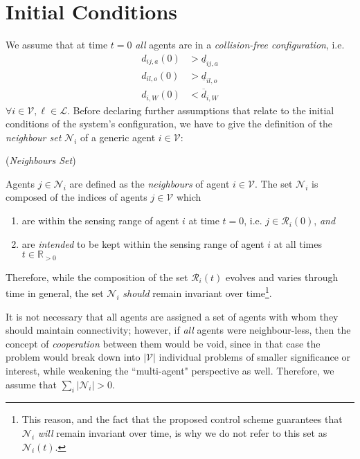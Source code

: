 \section{Initial Conditions}

We assume that at time $t=0$ \textit{all} agents are in a
\textit{collision-free configuration}, i.e.
\begin{subequations}
\begin{align}
    d_{ij,a}(0) &> \underline{d}_{ij,a} \\[2.5ex]
    d_{il,o}(0) &> \underline{d}_{il,o} \\[2.5ex]
    d_{i,W}(0)  &< \overline{d}_{i,W}
\label{eq:initially_coll_free}
\end{align}
\end{subequations}
$\forall i \in \mathcal{V}, \ell \in \mathcal{L}$. Before declaring further
assumptions that relate to the initial conditions of the system's configuration,
we have to give the definition of the \textit{neighbour set} $\mathcal{N}_i$ of
a generic agent $i \in \mathcal{V}$:
\begin{bw_box}
\begin{definition} (\textit{Neighbours Set})

Agents $j \in \mathcal{N}_i$ are defined as the \textit{neighbours} of
agent $i \in \mathcal{V}$. The set $\mathcal{N}_i$ is composed of the
indices of agents $j \in \mathcal{V}$ which
\begin{enumerate}
  \item are within the sensing range of agent $i$ at time $t=0$, i.e.
    $j \in \mathcal{R}_i(0)$, \textit{and}
  \item are \textit{intended} to be kept within the sensing range of agent $i$ at all
    times $t \in \mathbb{R}_{> 0}$
\end{enumerate}
\end{definition}
\end{bw_box}

Therefore, while the composition of the set $\mathcal{R}_i(t)$ evolves and
varies through time in general, the set $\mathcal{N}_i$ \textit{should} remain
invariant over time\footnote{This reason, and the fact that the proposed
control scheme guarantees that $\mathcal{N}_i$ \textit{will} remain invariant
over time, is why we do not refer to this set as $\mathcal{N}_i(t)$.}.

It is not necessary that all agents are assigned a set of agents with whom they
should maintain connectivity; however, if \textit{all} agents were
neighbour-less, then the concept of \textit{cooperation} between them would be
void, since in that case the problem would break down into $|\mathcal{V}|$
individual problems of smaller significance or interest, while weakening the
``multi-agent" perspective as well. Therefore, we assume that
$\sum\limits_i |\mathcal{N}_i| > 0$.

